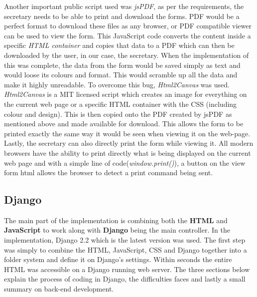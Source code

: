 \documentclass[../main.tex]{subfiles}
\begin{document}
Another important public script used was \textit{jsPDF}\cite{jsPDF}, as per the requirements, the secretary needs to be able to print and download the forms. PDF would be a perfect format to download these files as any browser, or PDF compatible viewer can be used to view the form. This JavaScript code converts the content inside a specific \textit{HTML container} and copies that data to a PDF which can then be downloaded by the user, in our case, the secretary. When the implementation of this was complete, the data from the form would be saved simply as text and would loose its colours and format. This would scramble up all the data and make it highly unreadable. To overcome this bug, \textit{Html2Canvas} was used. \\[4mm]

\textit{Html2Canvas}\cite{htmlcanvas} is a MIT licensed script which creates an image for everything on the current web page or a specific HTML container with the CSS (including colour and design). This is then copied onto the PDF created by jsPDF as mentioned above and made available for download. This allows the form to be printed exactly the same way it would be seen when viewing it on the web-page. \\[4mm]

Lastly, the secretary can also directly print the form while viewing it. All modern browsers have the ability to print directly what is being displayed on the current web page and with a simple line of code(\textit{window.print()}), a button on the view form html allows the browser to detect a print command being sent. 


\subsection{Django}
The main part of the implementation is combining both the \textbf{HTML} and \textbf{JavaScript} to work along with \textbf{Django} being the main controller. In the implementation, Django 2.2\cite{djangoLatest} which is the latest version was used. The first step was simply to combine the HTML, JavaScript, CSS and Django together into a folder system and define it on Django's settings. Within seconds the entire HTML was accessible on a Django running web server. The three sections below explain the process of coding in Django, the difficulties faces and lastly a small summary on back-end development. 
\end{document}
